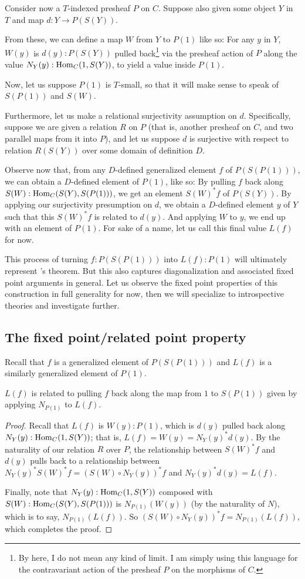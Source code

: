 Consider now a $T$-indexed presheaf $P$ on $C$. Suppose also given some object $Y$ in $T$ and map $d : Y \to P(S(Y))$.

From these, we can define a map $W$ from $Y$ to $P(1)$ like so: For any $y$ in $Y$, $W(y)$ is $d(y) : P(S(Y))$ pulled back\footnote{By  here, I do not mean any kind of limit. I am simply using this language for the contravariant action of the presheaf $P$ on the morphisms of $C$.} via the presheaf action of $P$ along the value $N_Y(y) : \operatorname{Hom}_C(1, S(Y))$, to yield a value inside $P(1)$.

Now, let us suppose $P(1)$ is $T$-small, so that it will make sense to speak of $S(P(1))$ and $S(W)$.

Furthermore, let us make a relational surjectivity assumption on $d$. Specifically, suppose we are given a relation $R$ on $P$ (that is, another presheaf on $C$, and two parallel maps from it into $P$), and let us suppose $d$ is surjective with respect to relation $R(S(Y))$ over some domain of definition $D$.

Observe now that, from any $D$-defined generalized element $f$ of $P(S(P(1)))$, we can obtain a $D$-defined element of $P(1)$, like so: By pulling $f$ back along $S(W) : \operatorname{Hom}_C(S(Y), S(P(1)))$, we get an element $S(W)^*f$ of $P(S(Y))$. By applying our surjectivity presumption on $d$, we obtain a $D$-defined element $y$ of $Y$ such that this $S(W)^*f$ is related to $d(y)$. And applying $W$ to $y$, we end up with an element of $P(1)$. For sake of a name, let us call this final value $L(f)$ for now.

This process of turning $f: P(S(P(1)))$ into $L(f): P(1)$ will ultimately represent \Loeb's theorem. But this also captures diagonalization and associated fixed point arguments in general. Let us observe the fixed point properties of this construction in full generality for now, then we will specialize to introspective theories and investigate further.

\subsection{The fixed point/related point property}
Recall that $f$ is a generalized element of $P(S(P(1)))$ and $L(f)$ is a similarly generalized element of $P(1)$.
\begin{theorem}
$L(f)$ is related to pulling $f$ back along the map from $1$ to $S(P(1))$ given by applying $N_{P(1)}$ to $L(f)$.
\end{theorem}
\begin{proof}
Recall that $L(f)$ is $W(y) : P(1)$, which is $d(y)$ pulled back along $N_Y(y) : \operatorname{Hom}_C(1, S(Y))$; that is, $L(f) = W(y) = N_Y(y)^* d(y)$. By the naturality of our relation $R$ over $P$, the relationship between $S(W)^*f$ and $d(y)$ pulls back to a relationship between $N_Y(y)^* S(W)^*f = (S(W) \circ N_Y(y))^* f$ and $N_Y(y)^* d(y) = L(f)$.

Finally, note that $N_Y(y) : \operatorname{Hom}_C(1, S(Y))$ composed with $S(W) : \operatorname{Hom}_C(S(Y), S(P(1)))$ is $N_{P(1)}(W(y))$ (by the naturality of $N$), which is to say, $N_{P(1)}(L(f))$. So $(S(W) \circ N_Y(y))^* f = N_{P(1)}(L(f))$, which completes the proof.
\end{proof}

